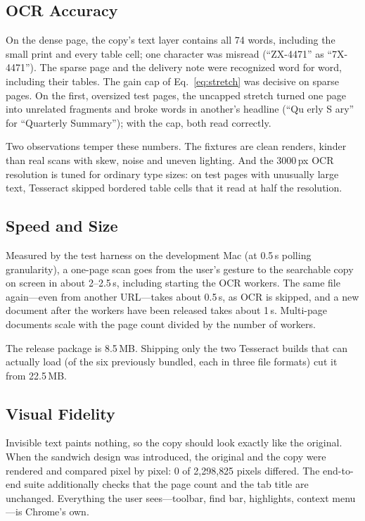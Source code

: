 \subsection{OCR Accuracy}
On the dense page, the copy's text layer contains all 74 words, including the
small print and every table cell; one character was misread (``ZX-4471'' as
``7X-4471''). The sparse page and the delivery note were recognized word for
word, including their tables. The gain cap of Eq.~\eqref{eq:stretch} was decisive
on sparse pages. On the first, oversized test pages, the uncapped stretch turned
one page into unrelated fragments and broke words in another's headline
(``Qu erly S ary'' for ``Quarterly Summary''); with the cap, both read correctly.

Two observations temper these numbers. The fixtures are clean renders, kinder
than real scans with skew, noise and uneven lighting. And the 3000\,px OCR
resolution is tuned for ordinary type sizes: on test pages with unusually large
text, Tesseract skipped bordered table cells that it read at half the
resolution.

\subsection{Speed and Size}
Measured by the test harness on the development Mac (at 0.5\,s polling
granularity), a one-page scan goes from the user's gesture to the searchable copy
on screen in about 2--2.5\,s, including starting the OCR workers. The same file
again---even from another URL---takes about 0.5\,s, as OCR is skipped, and a
new document after the workers have been released takes about 1\,s. Multi-page
documents scale with the page count divided by the number of workers.

The release package is 8.5\,MB. Shipping only the two Tesseract builds that can
actually load (of the six previously bundled, each in three file formats) cut it
from 22.5\,MB.

\subsection{Visual Fidelity}
Invisible text paints nothing, so the copy should look exactly like the
original. When the sandwich design was introduced, the original and the copy
were rendered and compared pixel by pixel: 0 of 2{,}298{,}825 pixels differed.
The end-to-end suite additionally checks that the page count and the tab title
are unchanged. Everything the user sees---toolbar, find bar, highlights,
context menu---is Chrome's own.

